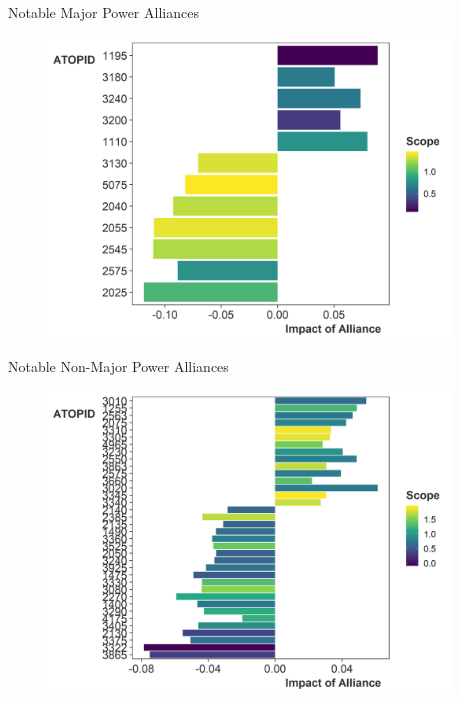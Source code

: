 \documentclass[12pt]{beamer}
\begin{document}

\begin{frame}{Notable Major Power Alliances}


\begin{figure}
	\centering
		\includegraphics[width=0.95\textwidth]{non-zero-maj.png}
	\label{fig:non-zero-maj}
\end{figure}


\end{frame}


\begin{frame}{Notable Non-Major Power Alliances}


\begin{figure}
	\centering
		\includegraphics[width=0.95\textwidth]{non-zero-min.png}
	\label{fig:non-zero-min}
\end{figure}


\end{frame}
\end{document}
